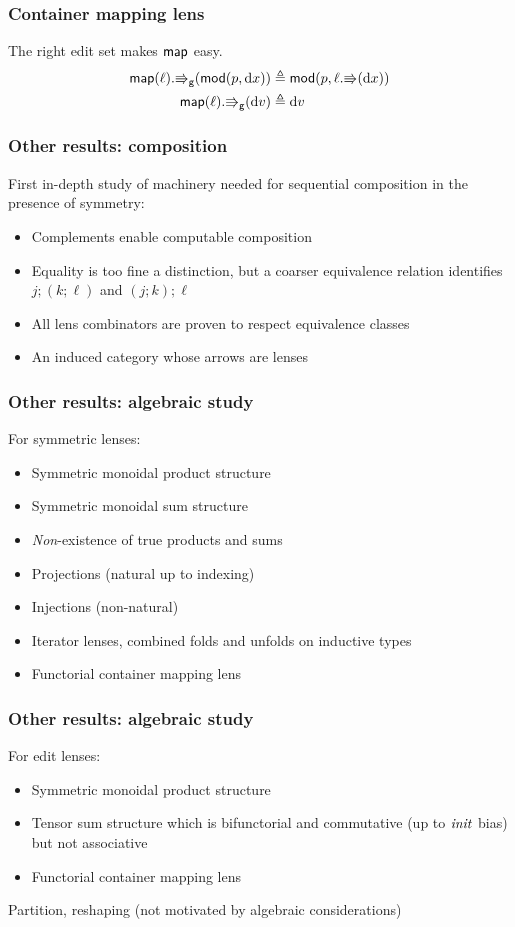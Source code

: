 \documentclass[table]{beamer}
\begin{document}
\begin{frame}
    \frametitle{Container mapping lens}
    The right edit set makes $\mathsf{map}$ easy.
    \begin{align*}
        \mathsf{map}(\ell).\mathord{\Rrightarrow}_{\mathsf{g}}(\mathsf{mod}(p,\textrm{d} x))
            &\triangleq \mathsf{mod}(p,\ell.\mathord{\Rrightarrow}(\textrm{d} x)) \\
        \mathsf{map}(\ell).\mathord{\Rrightarrow}_{\mathsf{g}}(\textrm{d} v) &\triangleq \textrm{d} v
    \end{align*}

\end{frame}

\begin{frame}
    \frametitle{Other results: composition}
    First in-depth study of machinery needed for sequential composition in
    the presence of symmetry:
    \begin{itemize}
        \item Complements enable computable composition
        \item Equality is too fine a distinction, but a coarser equivalence
            relation identifies $j;(k;\ell)$ and $(j;k);\ell$
        \item All lens combinators are proven to respect equivalence classes
        \item An induced category whose arrows are lenses
    \end{itemize}
\end{frame}

\begin{frame}
    \frametitle{Other results: algebraic study}
    For symmetric lenses:
    \begin{itemize}
        \item Symmetric monoidal product structure
        \item Symmetric monoidal sum structure
        \item \emph{Non}-existence of true products and sums
        \item Projections (natural up to indexing)
        \item Injections (non-natural)
        \item Iterator lenses, combined folds and unfolds on inductive types
        \item Functorial container mapping lens
    \end{itemize}
\end{frame}

\begin{frame}
    \frametitle{Other results: algebraic study}
    For edit lenses:
    \begin{itemize}
        \item Symmetric monoidal product structure
        \item Tensor sum structure which is bifunctorial and commutative (up
            to $\mathit{init}$ bias) but not associative
        \item Functorial container mapping lens
    \end{itemize}
    Partition, reshaping (not motivated by algebraic considerations)
\end{frame}
\end{document}
